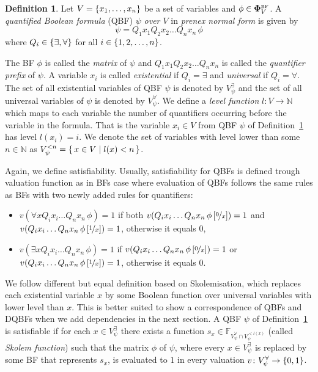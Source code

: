\documentclass[
  digital, %
  color,
  twoside, %
  table,   %
  nolof,     %
  nolot,     %
]{fithesis3}
\let\setbuilder\set
\newcommand{\simpleset}[1]{\{{#1}\}}
\renewcommand{\set}[1]{\normalexpandarg\IfSubStr{#1}{|}{\setbuilder{#1}}{\simpleset{#1}}}
\theoremstyle{definition}
\newtheorem{definition}{Definition}
\theoremstyle{remark}
\newcommand{\substitute}[2]{\left[ \nicefrac{#2}{#1} \right]}
\newcommand{\BF}[1]{\mathbf{\Phi}_{#1}^{\normalfont{\text{\tiny BF}}}}
\newcommand{\BFuncs}[1]{\mathbb{F}_{#1}}
\newcommand{\evars}[1]{V_{#1}^{\exists}}
\newcommand{\uvars}[1]{V_{#1}^{\forall}}
\newcommand{\itholds}{\,}
\begin{document}
\begin{definition}
Let $V = \set{x_1,\dots,x_n}$ be a set of variables and $\phi \in \BF{V}$. A \emph{quantified Boolean formula} (QBF) $\psi$ \emph{over $V$} in \emph{prenex normal form} is given by
\[\psi = Q_1 x_1 Q_2 x_2 \dots Q_n x_n \itholds \phi\]
where $Q_i \in \set{{\exists}, {\forall}}$ for all $i \in \set{1,2,\dots,n}$.
\label{def:QBF}
\end{definition}

The BF $\phi$ is called the \emph{matrix} of $\psi$ and $Q_1 x_1 Q_2 x_2 \dots Q_n x_n$ is called the \emph{quantifier prefix} of $\psi$. A variable $x_i$ is called \emph{existential} if $Q_i = \exists$ and \emph{universal} if $Q_i = \forall$. The set of all existential variables of QBF $\psi$ is denoted by $\evars{\psi}$ and the set of all universal variables of $\psi$ is denoted by $\uvars{\psi}$. We define a \emph{level function} $l\colon V \to \mathbb{N}$ which maps to each variable the number of quantifiers occurring before the variable in the formula. That is the variable $x_i \in V$ from QBF $\psi$ of Definition~\ref{def:QBF} has level $l(x_i) = i$. We denote the set of variables with level lower than some $n \in \mathbb{N}$ as $V_{\psi}^{<n} = \set{x \in V | l(x) < n}$.

\begin{sloppypar}
Again, we define satisfiability. Usually, satisfiability for QBFs is defined trough valuation function as in BFs case where evaluation of QBFs follows the same rules as BFs with two newly added rules for quantifiers:
\begin{itemize}
    \item $v(\forall x Q_i x_i \dots Q_n x_n \itholds \phi) = 1$ if both $v(Q_i x_i \dots Q_n x_n \itholds \phi\substitute{x}{0}) = 1$ and $v(Q_i x_i \dots Q_n x_n \itholds \phi\substitute{x}{1}) = 1$, otherwise it equals $0$,
    \item $v(\exists x Q_i x_i \dots Q_n x_n \itholds \phi) = 1$ if $v(Q_i x_i \dots Q_n x_n \itholds \phi\substitute{x}{0}) = 1$ or $v(Q_i x_i \dots Q_n x_n \itholds \phi\substitute{x}{1}) = 1$, otherwise it equals $0$.
\end{itemize}
\end{sloppypar}
We follow different but equal definition based on Skolemisation, which replaces each existential variable $x$ by some Boolean function over universal variables with lower level than $x$. This is better suited to show a correspondence of QBFs and DQBFs when we add dependencies in the next section. A QBF $\psi$ of Definition~\ref{def:QBF} is satisfiable if for each $x \in V_{\psi}^{\exists}$ there exists a function $s_{x} \in \BFuncs{\uvars{\psi}\cap V_{\psi}^{<l(x)}}$ (called \emph{Skolem function}) such that the matrix $\phi$ of $\psi$, where every $x \in \evars{\psi}$ is replaced by some BF that represents $s_x$, is evaluated to $1$ in every valuation $v\colon \uvars{\psi} \to \set{0,1}$.
\end{document}
